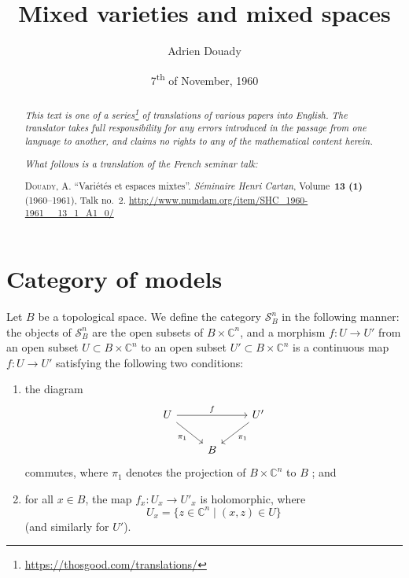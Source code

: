 \documentclass{article}
\title{Mixed varieties and mixed spaces}
\author{Adrien Douady}
\date{7\textsuperscript{th} of November, 1960}
\theoremstyle{plain}
\theoremstyle{definition}
\newcommand{\CC}{\mathbb{C}}
\newcommand{\oldpage}[1]{\marginpar{\footnotesize$\Big\vert$ \textit{p.~#1}}}
\begin{document}
\maketitle
\thispagestyle{fancy}

\renewcommand{\abstractname}{Translator's note.}

\begin{abstract}
  \renewcommand*{\thefootnote}{\fnsymbol{footnote}}
  \emph{This text is one of a series\footnote{\url{https://thosgood.com/translations/}} of translations of various papers into English.}
  \emph{The translator takes full responsibility for any errors introduced in the passage from one language to another, and claims no rights to any of the mathematical content herein.}

  \medskip
  
  \emph{What follows is a translation of the French seminar talk:}

  \medskip\noindent
  \textsc{Douady, A.}
  ``Vari\'{e}t\'{e}s et espaces mixtes''.
  \emph{S\'{e}minaire Henri Cartan}, Volume~\textbf{13 (1)} (1960--1961), Talk no.~2.
  {\url{http://www.numdam.org/item/SHC_1960-1961__13_1_A1_0/}}
\end{abstract}

\setcounter{footnote}{0}

\tableofcontents
\bigskip



\oldpage{2-01}
\section{Category of models}
\label{I}

Let $B$ be a topological space.
We define the category $\mathscr{S}_B^n$ in the following manner: the objects of $\mathscr{S}_B^n$ are the open subsets of $B\times\CC^n$, and a morphism $f\colon U\to U'$ from an open subset $U\subset B\times\CC^n$ to an open subset $U'\subset B\times\CC^n$ is a continuous map $f\colon U\to U'$ satisfying the following two conditions:
\begin{enumerate}
  \item the diagram
    \[
      \begin{tikzcd}
        U \ar[rr,"f"] \ar[dr,swap,"\pi_1"]
        && U' \ar[dl,"\pi_1"]
      \\&B&
      \end{tikzcd}
    \]
    commutes, where $\pi_1$ denotes the projection of $B\times\CC^n$ to $B$ ; and
  \item for all $x\in B$, the map $f_x\colon U_x\to U'_x$ is holomorphic, where
    \[
      U_x = \{z\in\CC^n \mid (x,z)\in U\}
    \]
    (and similarly for $U'$).
\end{enumerate}
\end{document}
